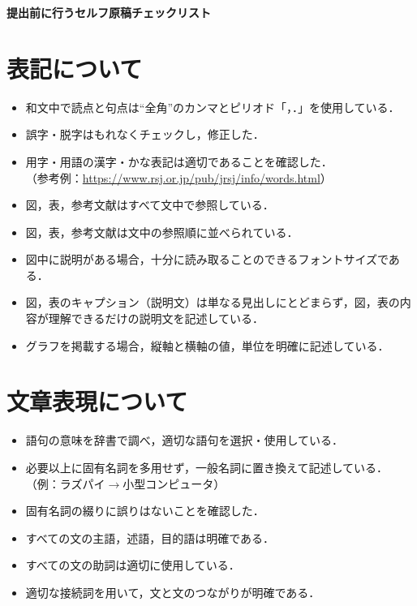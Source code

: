 \documentclass[a4paper,11pt,dvipdfmx]{jlreq}
\begin{document}
\begin{center}
\textbf{\Large
提出前に行うセルフ原稿チェックリスト %
}
\normalsize
\end{center}

\pagestyle{fancy}


\renewcommand{\labelitemi}{$\Box$}
\section{表記について}
\begin{itemize}
 \item 和文中で読点と句点は``全角''のカンマとピリオド「，．」を使用している．
 \item 誤字・脱字はもれなくチェックし，修正した．
 \item 用字・用語の漢字・かな表記は適切であることを確認した．\\
（参考例：\url{https://www.rsj.or.jp/pub/jrsj/info/words.html}）
 \item 図，表，参考文献はすべて文中で参照している．
 \item 図，表，参考文献は文中の参照順に並べられている．
 \item 図中に説明がある場合，十分に読み取ることのできるフォントサイズである．
 \item 図，表のキャプション（説明文）は単なる見出しにとどまらず，図，表の内容が理解できるだけの説明文を記述している．
 \item グラフを掲載する場合，縦軸と横軸の値，単位を明確に記述している．
 \end{itemize}

\section{文章表現について}
\begin{itemize}
 \item 語句の意味を辞書で調べ，適切な語句を選択・使用している．
 \item 必要以上に固有名詞を多用せず，一般名詞に置き換えて記述している．\\ 
（例：ラズパイ$\rightarrow$小型コンピュータ）
 \item 固有名詞の綴りに誤りはないことを確認した．
 \item すべての文の主語，述語，目的語は明確である．
 \item すべての文の助詞は適切に使用している．
 \item 適切な接続詞を用いて，文と文のつながりが明確である．
\end{itemize}
\end{document}
